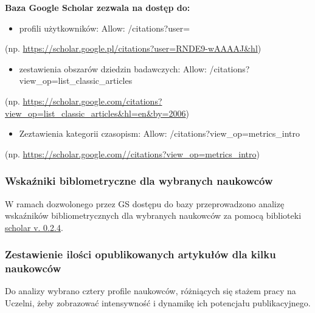 \documentclass[
  12pt,
]{article}
\providecommand{\tightlist}{%
  \setlength{\itemsep}{0pt}\setlength{\parskip}{0pt}}
\begin{document}
\textbf{Baza Google Scholar zezwala na dostęp do:}

\begin{itemize}
\tightlist
\item
  profili użytkowników: Allow: /citations?user=
\end{itemize}

(np.
\href{https://scholar.google.pl/citations?user=RNDE9-wAAAAJ&hl=pl}{https://scholar.google.pl/citations?user=RNDE9-wAAAAJ\&hl})

\begin{itemize}
\tightlist
\item
  zestawienia obszarów dziedzin badawczych: Allow:
  /citations?view\_op=list\_classic\_articles
\end{itemize}

(np.
\url{https://scholar.google.com/citations?view_op=list_classic_articles&hl=en&by=2006})

\begin{itemize}
\tightlist
\item
  Zeztawienia kategorii czasopism: Allow:
  /citations?view\_op=metrics\_intro
\end{itemize}

(np. \url{https://scholar.google.com//citations?view_op=metrics_intro})

\hypertarget{wskaux17aniki-biblometryczne-dla-wybranych-naukowcuxf3w}{%
\subsubsection{Wskaźniki biblometryczne dla wybranych
naukowców}\label{wskaux17aniki-biblometryczne-dla-wybranych-naukowcuxf3w}}

W ramach dozwolonego przez GS dostępu do bazy przeprowadzono analizę
wskaźników bibliometrycznych dla wybranych naukowców za pomocą
biblioteki
\href{https://cran.r-project.org/web/packages/scholar/index.html}{scholar
v. 0.2.4}.

\hypertarget{zestawienie-iloux15bci-opublikowanych-artykuux142uxf3w-dla-kilku-naukowcuxf3w}{%
\subsubsection{Zestawienie ilości opublikowanych artykułów dla kilku
naukowców}\label{zestawienie-iloux15bci-opublikowanych-artykuux142uxf3w-dla-kilku-naukowcuxf3w}}

Do analizy wybrano cztery profile naukowców, różniących się stażem pracy
na Uczelni, żeby zobrazować intensywność i dynamikę ich potencjału
publikacyjnego.
\end{document}
